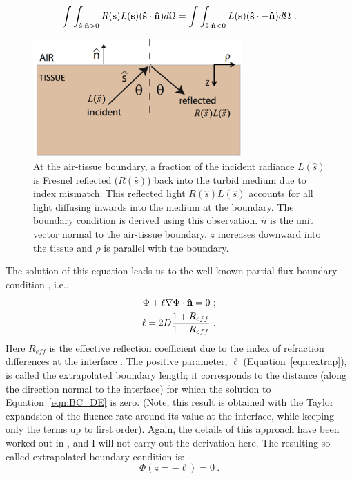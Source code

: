 \begin{equation}
\label{eqn:partialflux}
\int\int_{\mathbf{\hat{s}} \cdot \mathbf{\hat{n}} > 0} R(\mathbf{s}) L(\mathbf{s}) (\mathbf{\hat{s}} \cdot \mathbf{\hat{n}}) d\Omega =
\int\int_{\mathbf{\hat{s}} \cdot \mathbf{\hat{n}} < 0} L(\mathbf{s}) (\mathbf{\hat{s}} \cdot {- \bf\hat{n}}) d\Omega \ .
\end{equation}
%
\indent
\begin{figure}[t]
\centering
\label{fig:boundary}
\includegraphics[width=8cm]{./figures/2_Theory/BoundaryReflect.png}
\caption[Diagram of air-tissue boundary]{At the air-tissue boundary, a fraction of the incident radiance $L(\hat{s})$ is Fresnel reflected ($R(\hat{s})$) back into the turbid medium due to index mismatch. This reflected light $R(\hat{s})L(\hat{s})$ accounts for all light diffusing inwards into the medium at the boundary. The boundary condition is derived using this observation. $\hat{n}$ is the unit vector normal to the air-tissue boundary. $z$ increases downward into the tissue and $\rho$ is parallel with the boundary.}
\end{figure}
The solution of this equation leads us to the well-known partial-flux boundary condition \cite{Haskell1994,Aronson1995}, i.e.,
\begin{align}
\Phi + \ell \nabla \Phi\cdot\mathbf{\hat{n}} = 0 \label{eqn:BC_DE} \ ; \\ 
\ell = 2D\frac{1+R_{eff}}{1-R_{eff}} \ .
\label{eqn:extrap}
\end{align}
Here $R_{eff}$ is the effective reflection coefficient due to the index of refraction differences at the interface \cite{Orchard1969,Godavarty2002}. The positive parameter, $\ell$ (Equation~\ref{eqn:extrap}), is called the extrapolated boundary length; it corresponds to the distance (along the direction normal to the interface) for which the solution to Equation~\ref{eqn:BC_DE} is zero. (Note, this result is obtained with the Taylor expandsion of the fluence rate around its value at the interface, while keeping only the terms up to first order). Again, the details of this approach have been worked out in \cite{Haskell1994,Aronson1993,Aronson1995,Durduran2010}, and I will not carry out the derivation here. The resulting so-called extrapolated boundary condition is:
\begin{equation}
\Phi(z=-\ell)= 0 \ .
\end{equation}

